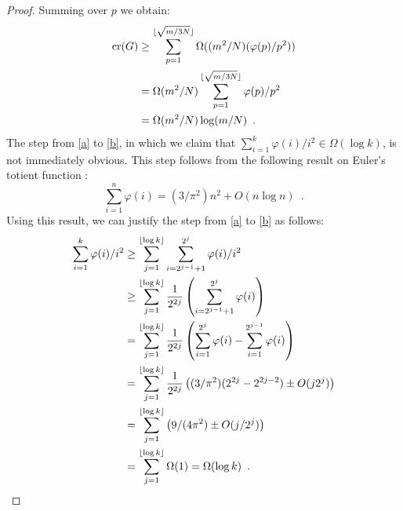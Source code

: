 \documentclass{patmorin}
\newcommand{\n}{N}
\DeclareMathOperator{\crs}{cr}
\begin{document}
\begin{proof}
  Summing over $p$ we obtain:
  \begin{align}
     \crs(G) & \ge \sum_{p=1}^{\lfloor\sqrt{m/3\n}\rfloor} \Omega((m^2/\n)(\varphi(p)/p^2)) \\
             & = \Omega(m^2/\n)\sum_{p=1}^{\lfloor\sqrt{m/3\n}\rfloor} \varphi(p)/p^2 \eqlabel{a} \\
             & = \Omega(m^2/\n)\log(m/\n) \enspace . \eqlabel{b}
  \end{align}
  The step from \eqref{a} to \eqref{b}, in which we claim that
  $\sum_{i=1}^k \varphi(i)/i^2\in\Omega(\log k)$, is not immediately
  obvious.
  This step follows from the following result on Euler's
  totient function \cite[Theorem~330]{hardy.wright:introduction}:
  \[
      \sum_{i=1}^n \varphi(i) = (3/\pi^2)n^2 + O(n\log n) \enspace .
  \]
  Using this result, we can justify the step from \eqref{a} to \eqref{b}
  as follows:
  \begin{align*}
    \sum_{i=1}^k \varphi(i)/i^2 
      &\ge \sum_{j=1}^{\lfloor\log k\rfloor}
             \sum_{i=2^{j-1}+1}^{2^j} \varphi(i)/i^2  \\
      &\ge \sum_{j=1}^{\lfloor\log k\rfloor}\frac{1}{2^{2j}}
             \left(\sum_{i=2^{j-1}+1}^{2^j} \varphi(i)\right)  \\
      &= \sum_{j=1}^{\lfloor\log k\rfloor}\frac{1}{2^{2j}}
             \left(\sum_{i=1}^{2^j}\varphi(i)-\sum_{i=1}^{2^{j-1}} \varphi(i)\right)  \\
      &= \sum_{j=1}^{\lfloor\log k\rfloor}\frac{1}{2^{2j}}
             \left((3/\pi^2)(2^{2j}-2^{2j-2})\pm O(j2^j)\right)  \\
      &= \sum_{j=1}^{\lfloor\log k\rfloor}
             \left(9/(4\pi^2)\pm O(j/2^{j})\right)  \\
      &= \sum_{j=1}^{\lfloor\log k\rfloor} \Omega(1) = \Omega(\log k) \enspace . \qedhere
  \end{align*}
\end{proof}
\end{document}
